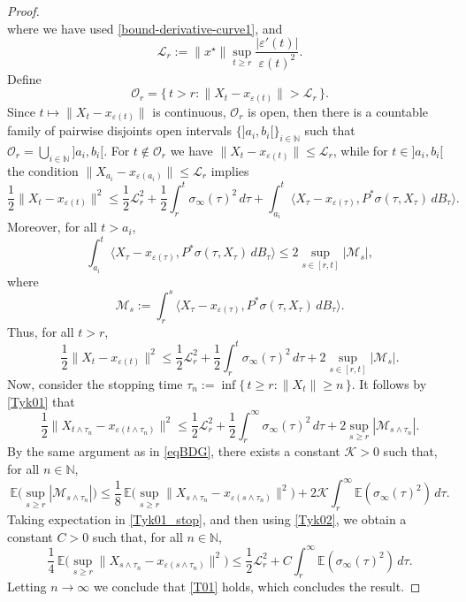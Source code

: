 \documentclass[10pt,a4paper]{amsart}
\newcommand{\N}{\mathbb{N}}
\renewcommand{\epsilon}{\varepsilon}
\begin{document}
\begin{proof}
\begin{equation*}
	\end{equation*}
	where we have used \eqref{bound-derivative-curve1}, and
	\[
	\mathcal{L}_{r} := \|x^\star\| \sup_{t\geq r}\frac{|\epsilon'(t)|}{\epsilon(t)^2}.
	\]
	Define
	\[
	\mathcal{O}_r= \{\,t>r : \|X_t-x_{\epsilon(t)}\| > \mathcal{L}_{r} \,\}.
	\]
	Since $t \mapsto \|X_t-x_{\epsilon(t)}\|$ is continuous, $\mathcal{O}_r$ is open, then there is a countable family of pairwise disjoints open intervals $\{]a_i,b_i[\}_{i\in \N}$ such that $\mathcal{O}_r = \bigcup_{i\in \N}]a_i,b_i[$.  
	For $t\notin \mathcal{O}_r$ we have $\|X_t-x_{\epsilon(t)}\|\leq \mathcal{L}_{r}$, while for $t\in ]a_i,b_i[$ the condition $\|X_{a_i}-x_{\epsilon(a_i)}\|\leq \mathcal{L}_{r}$ implies
	\begin{equation*}
		\frac{1}{2}\|X_t-x_{\epsilon(t)}\|^2
		\leq \frac{1}{2}\mathcal{L}_{r}^2 
		+ \frac{1}{2}\int_{r}^t \sigma_\infty(\tau)^2 \, d\tau
		+ \int_{a_i}^t \langle X_\tau-x_{\epsilon(\tau)},P^\ast\sigma(\tau,X_\tau)\, dB_\tau \rangle .
	\end{equation*}
	Moreover, for all $t>a_i$,
	\[
	\int_{a_i}^t \langle X_\tau-x_{\epsilon(\tau)},P^\ast\sigma(\tau,X_\tau)\, dB_\tau \rangle 
	\leq 2 \sup_{s\in [r, t]} |\mathscr{M}_s|,
	\]
	where
	\[
	\mathscr{M}_s := \int_{r}^s \langle X_\tau-x_{\epsilon(\tau)},P^\ast\sigma(\tau,X_\tau)\, dB_\tau \rangle.
	\]
	Thus, for all $t>r$,
	\begin{equation}\label{Tyk01}
		\frac{1}{2}\|X_t-x_{\epsilon(t)}\|^2
		\leq \frac{1}{2}\mathcal{L}_{r}^2 
		+ \frac{1}{2}\int_{r}^t \sigma_\infty(\tau)^2 \, d\tau
		+ 2 \sup_{s\in [r,t]} |\mathscr{M}_s|.
	\end{equation}
	Now, consider the stopping time $\tau_n := \inf\{\,t\geq r : \|X_t\|\geq n \,\}$.  It follows by \eqref{Tyk01} that 
	\begin{equation}\label{Tyk01_stop}
			\frac{1}{2}\|X_{t\wedge \tau_n}-x_{\epsilon(t\wedge \tau_n)}\|^2
			\leq \frac{1}{2}\mathcal{L}_{r}^2 
			+ \frac{1}{2}\int_{r}^\infty \sigma_\infty(\tau)^2 \, d\tau
			+ 2 \sup_{s\geq r} |\mathscr{M}_{s\wedge \tau_n} |.
		\end{equation}
	By the same argument as in \eqref{eqBDG}, there exists a constant $\mathcal{K}>0$ such that, for all $n\in\N$,
	\begin{equation}\label{Tyk02}
		\mathbb{E}\Big(\sup_{s \geq r} |\mathscr{M}_{s\wedge\tau_n}|\Big) 
		\leq \frac{1}{8}\,\mathbb{E}\Big(\sup_{s\geq r}\|X_{s\wedge\tau_n}-x_{\epsilon(s\wedge\tau_n)}\|^2\Big) 
		+ 2 \mathcal{K} \int_{r}^\infty \mathbb{E}(\sigma_\infty(\tau)^2) \, d\tau.
	\end{equation}
	Taking expectation in  \eqref{Tyk01_stop},  and then using \eqref{Tyk02}, we obtain a constant $C>0$ such that, for all $n\in\N$,
	\begin{equation*}
		\frac{1}{4}\, \mathbb{E}\Big(\sup_{s\geq r}\|X_{s\wedge\tau_n}-x_{\epsilon(s\wedge\tau_n)}\|^2\Big) 
		\leq \frac{1}{2} \mathcal{L}_{r}^2 + C\int_{r}^\infty \mathbb{E}(\sigma_\infty(\tau)^2) \, d\tau.
	\end{equation*}
    Letting $n\to\infty$ we conclude that \eqref{T01}  holds,   which concludes the result.
\end{proof}
\end{document}
